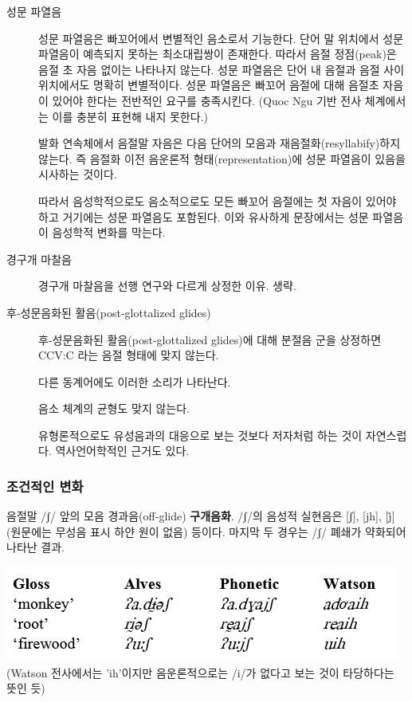 \begin{description}
\item[성문 파열음\label{성문 파열음}]{성문 파열음은 빠꼬어에서 변별적인 음소로서 기능한다. 단어 말 위치에서 성문 파열음이 예측되지 못하는 최소대립쌍이 존재한다. 따라서 음절 정점(peak)은 음절 초 자음 없이는 나타나지 않는다. 성문 파열음은 단어 내 음절과 음절 사이 위치에서도 명확히 변별적이다. 성문 파열음은 빠꼬어 음절에 대해 음절초 자음이 있어야 한다는 전반적인 요구를 충족시킨다. (Quoc Ngu 기반 전사 체계에서는 이를 충분히 표현해 내지 못한다.)

발화 연속체에서 음절말 자음은 다음 단어의 모음과 재음절화(resyllabify)하지 않는다. 즉 음절화 이전 음운론적 형태(representation)에 성문 파열음이 있음을 시사하는 것이다.

따라서 음성학적으로도 음소적으로도 모든 빠꼬어 음절에는 첫 자음이 있어야 하고 거기에는 성문 파열음도 포함된다. 이와 유사하게 문장에서는 성문 파열음이 음성학적 변화를 막는다.}
\item[경구개 마찰음\label{경구개 마찰음}]{경구개 마찰음을 선행 연구와 다르게 상정한 이유. 생략.}
\item[후-성문음화된 활음(post-glottalized glides)\label{후-성문음화된 활음(post-glottalized glides)}]{후-성문음화된 활음(post-glottalized glides)에 대해 분절음 군을 상정하면 CCV:C 라는 음절 형태에 맞지 않는다.

다른 동계어에도 이러한 소리가 나타난다.

음소 체계의 균형도 맞지 않는다.

유형론적으로도 유성음과의 대응으로 보는 것보다 저자처럼 하는 것이 자연스럽다. 역사언어학적인 근거도 있다.}
\end{description}

\subsubsection{조건적인 변화}
음절말 /ʃ/ 앞의 모음 경과음(off-glide) {\textbf{구개음화}}. /ʃ/의 음성적 실현음은 [ʃ], [jh], [j̊](원문에는 무성음 표시 하얀 원이 없음) 등이다. 마지막 두 경우는 /ʃ/ 폐쇄가 약화되어 나타난 결과.

\includegraphics{Pacoh/src/sh-gloss.png} \\
(Watson 전사에서는 'ih'이지만 음운론적으로는 /i/가 없다고 보는 것이 타당하다는 뜻인 듯)

